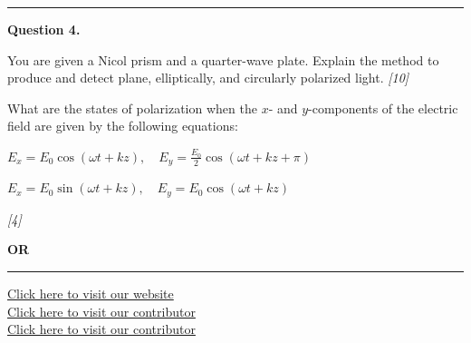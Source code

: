 \documentclass[11pt,a4paper]{article}
\newcommand{\pts}[1]{\hfill   \textit{[#1]}}
\begin{document}
\medskip\rule{\linewidth}{0.2pt}




\noindent   \textbf{Question 4.}

\begin{parts}
  \item You are given a Nicol prism and a quarter-wave plate. Explain the method to produce and detect plane, elliptically, and circularly polarized light. \pts{10}
  \item What are the states of polarization when the $x$- and $y$-components of the electric field are given by the following equations:
    
\begin{parts}
      \item $E_x = E_0 \cos(\omega t + kz), \quad E_y = \frac{E_0}{2} \cos(\omega t + kz + \pi)$
      \item $E_x = E_0 \sin(\omega t + kz), \quad E_y = E_0 \cos(\omega t + kz)$
    \end{parts} \pts{4}
\end{parts}
\hfill   \textbf{OR}


\vfill
\rule{\linewidth}{0.4pt}

\begin{center}\small
  \href{https://bhu-exam.vercel.app/}{Click here to visit our website}\\[4pt]
  \href{https://me-aryan.vercel.app/}{Click here to visit our contributor}\\[4pt]
  \href{https://quashan-me.vercel.app/}{Click here to visit our contributor}
\end{center}
\end{document}
